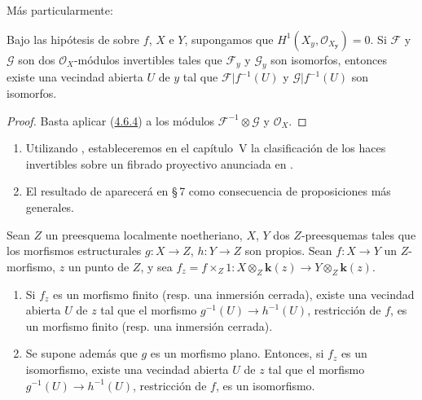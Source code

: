 Más particularmente:

\begin{corollary}[4.6.5]
\label{III.4.6.5}
\label{III.4.6.5-fr}
Bajo las hipótesis de  sobre $f$, $X$ e $Y$,
supongamos que
$H^1(X_y,\mathcal O_{X_{\boldsymbol{y}}})=0$.
Si $\mathcal F$ y $\mathcal G$ son dos $\mathcal O_X$-módulos invertibles tales
que $\mathcal F_y$ y $\mathcal G_y$ son isomorfos, entonces existe una vecindad
abierta $U$ de $y$
tal que $\mathcal F|f^{-1}(U)$ y $\mathcal G|f^{-1}(U)$ son isomorfos.
\end{corollary}

\begin{proof}
Basta aplicar (\hyperref[III.4.6.4-fr]{4.6.4}) a los módulos
$\mathcal F^{-1}\otimes\mathcal G$ y $\mathcal O_X$.
\end{proof}

\begin{remarks}[4.6.6]
\label{III.4.6.6}
\label{III.4.6.6-fr}
\begin{enumerate}
\item[(i)] Utilizando , estableceremos en el capítulo~V
  la clasificación de los haces invertibles sobre un fibrado proyectivo
  anunciada en .
\item[(ii)] El resultado de  aparecerá en \S\,7 como
  consecuencia de proposiciones más generales.
\end{enumerate}
\end{remarks}

\begin{proposition}[4.6.7]
\label{III.4.6.7-fr}
Sean $Z$ un preesquema localmente noetheriano, $X$, $Y$ dos $Z$-preesquemas
tales que los morfismos estructurales $g:X\to Z$, $h:Y\to Z$ son propios.
Sean $f:X\to Y$ un $Z$-morfismo, $z$ un punto de $Z$, y sea
$f_z=f\times_Z1:
X\otimes_Z\boldsymbol{k}(z)\longrightarrow Y\otimes_Z\boldsymbol{k}(z)$.
\begin{enumerate}
\item[\textup{(i)}] Si $f_z$ es un morfismo finito \textup{(resp.} una inmersión cerrada),
existe una vecindad abierta $U$ de $z$ tal que el morfismo
$g^{-1}(U)\to h^{-1}(U)$, restricción de $f$, es un morfismo finito \textup{(resp.}
una inmersión cerrada).
\item[\textup{(ii)}] Se supone además que $g$ es un morfismo plano. Entonces, si
$f_z$ es un isomorfismo, existe una vecindad abierta $U$ de $z$ tal que
el morfismo $g^{-1}(U)\to h^{-1}(U)$, restricción de $f$, es un
isomorfismo.
\end{enumerate}
\end{proposition}

